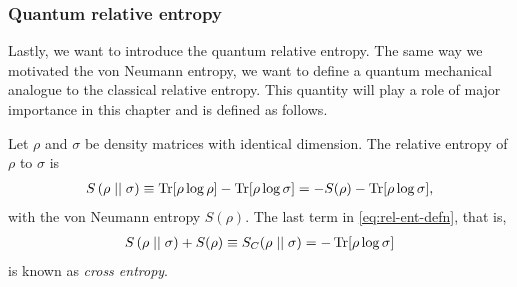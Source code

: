 \subsubsection{Quantum relative entropy}
Lastly, we want to introduce the quantum relative entropy. 
The same way we
motivated the von Neumann entropy, we want to define a quantum mechanical
analogue to the classical relative entropy. This quantity will play a role of
major importance in this chapter and is defined as follows.

\begin{defn}\label{defn:rel-ent}
  Let $\rho$ and $\sigma$ be density matrices with identical dimension. The
  relative entropy of $\rho$ to $\sigma$ is
  \begin{align}\label{eq:rel-ent-defn}
    S\left(\rho\mid\mid\sigma\right) \equiv \Tr[\rho\log\rho] -
    \Tr[\rho\log\sigma] = -S(\rho) - \Tr[\rho\log\sigma]
  ,\end{align}
  with the von Neumann entropy $S(\rho)$.
  The last term in \cref{eq:rel-ent-defn}, that is, 
  \begin{align}
    S\left( \rho\mid\mid\sigma \right) + S(\rho) \equiv S_C(\rho\mid\mid\sigma) = -\Tr[\rho\log\sigma]
  \end{align}
  is known as \emph{cross entropy}. 
\end{defn}

